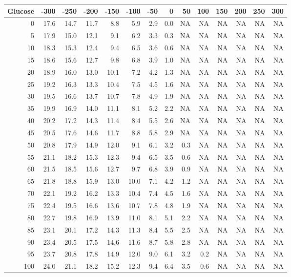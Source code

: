 
\begin{tabular}{rrrrrrrrrrrrrr}
\toprule
Glucose & -300 & -250 & -200 & -150 & -100 & -50 & 0 & 50 & 100 & 150 & 200 & 250 & 300\\
\midrule
0 & 17.6 & 14.7 & 11.7 & 8.8 & 5.9 & 2.9 & 0.0 & NA & NA & NA & NA & NA & NA\\
5 & 17.9 & 15.0 & 12.1 & 9.1 & 6.2 & 3.3 & 0.3 & NA & NA & NA & NA & NA & NA\\
10 & 18.3 & 15.3 & 12.4 & 9.4 & 6.5 & 3.6 & 0.6 & NA & NA & NA & NA & NA & NA\\
15 & 18.6 & 15.6 & 12.7 & 9.8 & 6.8 & 3.9 & 1.0 & NA & NA & NA & NA & NA & NA\\
20 & 18.9 & 16.0 & 13.0 & 10.1 & 7.2 & 4.2 & 1.3 & NA & NA & NA & NA & NA & NA\\
25 & 19.2 & 16.3 & 13.3 & 10.4 & 7.5 & 4.5 & 1.6 & NA & NA & NA & NA & NA & NA\\
30 & 19.5 & 16.6 & 13.7 & 10.7 & 7.8 & 4.9 & 1.9 & NA & NA & NA & NA & NA & NA\\
35 & 19.9 & 16.9 & 14.0 & 11.1 & 8.1 & 5.2 & 2.2 & NA & NA & NA & NA & NA & NA\\
40 & 20.2 & 17.2 & 14.3 & 11.4 & 8.4 & 5.5 & 2.6 & NA & NA & NA & NA & NA & NA\\
45 & 20.5 & 17.6 & 14.6 & 11.7 & 8.8 & 5.8 & 2.9 & NA & NA & NA & NA & NA & NA\\
50 & 20.8 & 17.9 & 14.9 & 12.0 & 9.1 & 6.1 & 3.2 & 0.3 & NA & NA & NA & NA & NA\\
55 & 21.1 & 18.2 & 15.3 & 12.3 & 9.4 & 6.5 & 3.5 & 0.6 & NA & NA & NA & NA & NA\\
60 & 21.5 & 18.5 & 15.6 & 12.7 & 9.7 & 6.8 & 3.9 & 0.9 & NA & NA & NA & NA & NA\\
65 & 21.8 & 18.8 & 15.9 & 13.0 & 10.0 & 7.1 & 4.2 & 1.2 & NA & NA & NA & NA & NA\\
70 & 22.1 & 19.2 & 16.2 & 13.3 & 10.4 & 7.4 & 4.5 & 1.6 & NA & NA & NA & NA & NA\\
75 & 22.4 & 19.5 & 16.6 & 13.6 & 10.7 & 7.8 & 4.8 & 1.9 & NA & NA & NA & NA & NA\\
80 & 22.7 & 19.8 & 16.9 & 13.9 & 11.0 & 8.1 & 5.1 & 2.2 & NA & NA & NA & NA & NA\\
85 & 23.1 & 20.1 & 17.2 & 14.3 & 11.3 & 8.4 & 5.5 & 2.5 & NA & NA & NA & NA & NA\\
90 & 23.4 & 20.5 & 17.5 & 14.6 & 11.6 & 8.7 & 5.8 & 2.8 & NA & NA & NA & NA & NA\\
95 & 23.7 & 20.8 & 17.8 & 14.9 & 12.0 & 9.0 & 6.1 & 3.2 & 0.2 & NA & NA & NA & NA\\
100 & 24.0 & 21.1 & 18.2 & 15.2 & 12.3 & 9.4 & 6.4 & 3.5 & 0.6 & NA & NA & NA & NA\\
\bottomrule
\end{tabular}